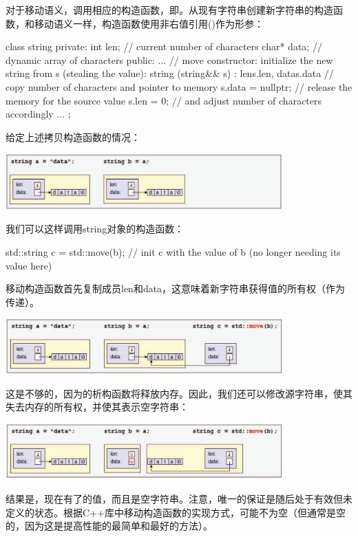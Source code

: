 对于移动语义，调用相应的构造函数，即。从现有字符串创建新字符串的构造函数，和移动语义一样，构造函数使用非右值引用(\cppinline{\&\&})作为形参：

\begin{cppcode}
class string {
	private:
	int len; // current number of characters
	char* data; // dynamic array of characters
	public:
	...
	// move constructor: initialize the new string from s (stealing the value):
	string (string&& s)
	: len{s.len}, data{s.data} { // copy number of characters and pointer to memory
		s.data = nullptr; // release the memory for the source value
		s.len = 0; // and adjust number of characters accordingly
	}
	...
};
\end{cppcode}

给定上述拷贝构造函数的情况：

\begin{center}
	\includegraphics[width=0.8\textwidth]{part1/ch1/images/20}
\end{center}

我们可以这样调用string对象的构造函数：

\begin{cppcode}
std::string c = std::move(b); // init c with the value of b (no longer needing its value here)
\end{cppcode}

移动构造函数首先复制成员len和data，这意味着新字符串获得值的所有权（作为传递）。

\begin{center}
	\includegraphics[width=0.8\textwidth]{part1/ch1/images/21}
\end{center}

这是不够的，因为的析构函数将释放内存。因此，我们还可以修改源字符串，使其失去内存的所有权，并使其表示空字符串：

\begin{center}
	\includegraphics[width=0.8\textwidth]{part1/ch1/images/22}
\end{center}

结果是，现在有了的值，而且是空字符串。注意，唯一的保证是随后处于有效但未定义的状态。根据C++库中移动构造函数的实现方式，可能不为空（但通常是空的，因为这是提高性能的最简单和最好的方法）。


















